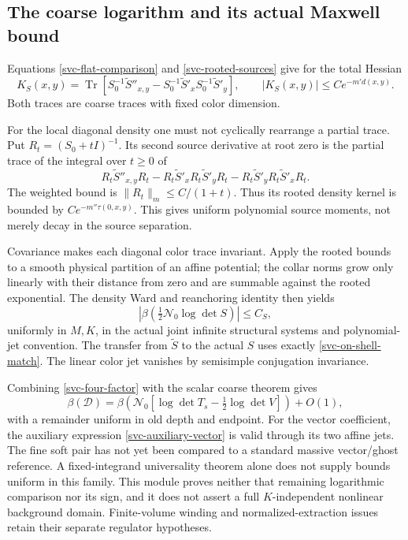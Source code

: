 \subsection{The coarse logarithm and its actual Maxwell bound}
\label{svc-maxwell-section}

Equations \eqref{svc-flat-comparison} and
\eqref{svc-rooted-sources} give for the total Hessian
\begin{equation}
 K_S(x,y)=\operatorname{Tr}\left[
 S_0^{-1}\widetilde S''_{x,y}
 -S_0^{-1}\widetilde S'_xS_0^{-1}\widetilde S'_y\right],
 \qquad |K_S(x,y)|\le Ce^{-m' d(x,y)}.
 \label{svc-log-hessian}
\end{equation}
Both traces are coarse traces with fixed color dimension.

For the local diagonal density one must not cyclically rearrange a
partial trace. Put $R_t=(S_0+tI)^{-1}$. Its second source derivative
at root zero is the partial trace of the integral over $t\ge0$ of
\begin{equation}
 R_t\widetilde S''_{x,y}R_t
 -R_t\widetilde S'_xR_t\widetilde S'_yR_t
 -R_t\widetilde S'_yR_t\widetilde S'_xR_t.
 \label{svc-density-resolvent}
\end{equation}
The weighted bound is $\|R_t\|_m\le C/(1+t)$.
Thus its rooted density kernel is bounded by
$Ce^{-m''\tau(0,x,y)}$. This gives uniform polynomial source moments,
not merely decay in the source separation.

Covariance makes each diagonal color trace invariant. Apply the
rooted bounds to a smooth physical partition of an affine potential;
the collar norms grow only linearly with their distance from zero and
are summable against the rooted exponential. The density Ward and
reanchoring identity then yields
\begin{equation}
 \left|\beta\left(\tfrac12\mathcal N_0\log\det S\right)\right|
       \le C_S,
 \label{svc-bounded-remainder}
\end{equation}
uniformly in $M,K$, in the actual joint infinite structural systems
and polynomial-jet convention. The transfer from $\widetilde S$ to the
actual $S$ uses exactly \eqref{svc-on-shell-match}. The linear color jet
vanishes by semisimple conjugation invariance.

Combining \eqref{svc-four-factor} with the scalar coarse theorem gives
\begin{equation}
 \beta(\mathcal D)
  =\beta\!\left(\mathcal N_0
       [\log\det T_s-\tfrac12\log\det V]\right)+O(1),
 \label{svc-final-reduction}
\end{equation}
with a remainder uniform in old depth and endpoint. For the vector
coefficient, the auxiliary expression
\eqref{svc-auxiliary-vector} is valid through its two affine jets.
The fine soft pair has not yet been compared to a standard massive
vector/ghost reference. A fixed-integrand universality theorem alone
does not supply bounds uniform in this family. This module proves
neither that remaining logarithmic comparison nor its sign, and it
does not assert a full $K$-independent nonlinear background domain.
Finite-volume winding and normalized-extraction issues retain their
separate regulator hypotheses.


